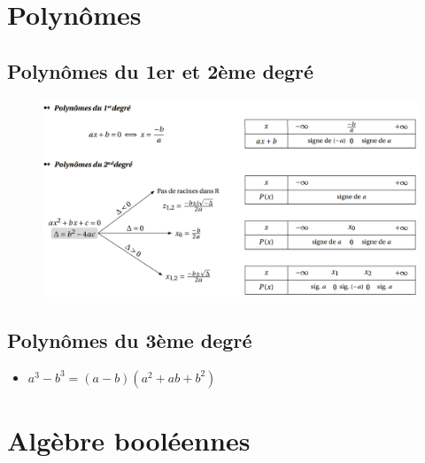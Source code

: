 \documentclass[12]{article}%
\theoremstyle{plain}
\theoremstyle{definition}
\theoremstyle{remark}
\begin{document}
\newpage
\section{Polynômes}
\subsection{Polynômes du 1er et 2ème degré}
\begin{figure}[h] %
	\centering\texttt{}
	\includegraphics[width=1\textwidth]{./images/polynomes.png} %
	\label{fig:polynome} %
\end{figure}
\subsection{Polynômes du 3ème degré}
\begin{itemize}
	\item \(\boxed{a^{3}-b^{3} = (a-b)(a^{2}+ab+b^{2})} \)
\end{itemize}

\newpage
\section{Algèbre booléennes}
\end{document}
